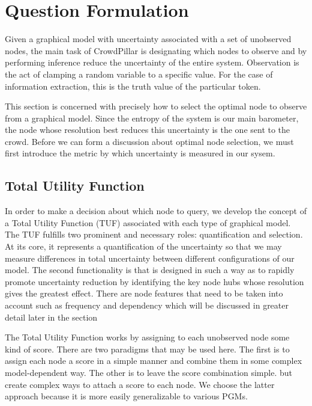 \section{Question Formulation}

Given a graphical model with uncertainty associated with a set of unobserved nodes, the main task of CrowdPillar is designating which nodes to observe and by performing inference reduce the uncertainty of the entire system.  Observation is the act of clamping a random variable to a specific value.  For the case of information extraction, this is the truth value of the particular token.

This section is concerned with precisely how to select the optimal node to observe from a graphical model.  Since the entropy of the system is our main barometer, the node whose resolution best reduces this uncertainty is the one sent to the crowd.  Before we can form a discussion about optimal node selection, we must first introduce the metric by which uncertainty is measured in our sysem.


\subsection{Total Utility Function}

In order to make a decision about which node to query, we develop the concept of a Total Utility Function (TUF) associated with each type of graphical model. The TUF fulfills two prominent and necessary roles: quantification and selection.  At its core, it represents a quantification of the uncertainty so that we may measure differences in total uncertainty between different configurations of our model.  The second functionality is that is designed in such a way as to rapidly promote uncertainty reduction by identifying the key node hubs whose resolution gives the greatest effect.  There are node features that need to be taken into account such as frequency and dependency which will be discussed in greater detail later in the section 

The Total Utility Function works by assigning to each unobserved node some kind of score. There are two paradigms that may be used here.  The first is to assign each node a score in a simple manner and combine them in some complex model-dependent way.  The other is to leave the score combination simple. but create complex ways to attach a score to each node.  We choose the latter approach because it is more easily generalizable to various PGMs.

